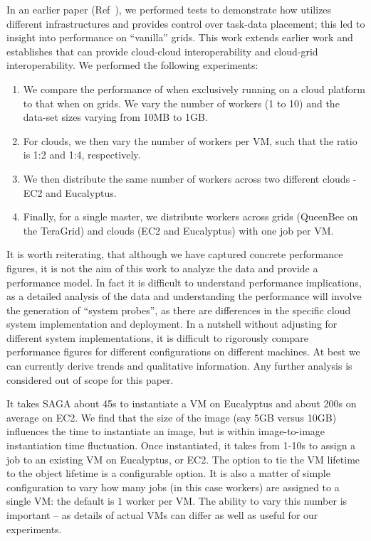 \documentclass[graybox]{svmult}
\begin{document}
In an earlier paper (Ref~\cite{saga_ccgrid09}), we performed tests to
demonstrate how \sagamapreduce utilizes different infrastructures and
provides control over task-data placement; this led to insight into
performance on ``vanilla'' grids.  This work extends earlier work and
establishes that \sagamapreduce can provide cloud-cloud
interoperability and cloud-grid interoperability.  We performed the
following experiments:

\begin{enumerate}

 \item We compare the performance of \sagamapreduce when exclusively
 running on a cloud platform to that when on grids. We vary the number
 of workers (1 to 10) and the data-set sizes varying from 10MB to 1GB.

 \item For clouds, we then vary the number of workers per VM, such
 that the ratio is 1:2 and 1:4, respectively.

 \item We then distribute the same number of workers across two
 different clouds - EC2 and Eucalyptus.

 \item Finally, for a single master, we distribute workers across
 grids (QueenBee on the TeraGrid) and clouds (EC2 and Eucalyptus) with
 one job per VM.

\end{enumerate}

It is worth reiterating, that although we have captured concrete
performance figures, it is not the aim of this work to analyze the
data and provide a performance model. In fact it is difficult to
understand performance implications, as a detailed analysis of the
data and understanding the performance will involve the generation of
``system probes'', as there are differences in the specific cloud
system implementation and deployment.  In a nutshell without adjusting
for different system implementations, it is difficult to rigorously
compare performance figures for different configurations on different
machines. At best we can currently derive trends and qualitative
information.  Any further analysis is considered out of scope for this
paper.

It takes SAGA about 45s to instantiate a VM on Eucalyptus and about
200s on average on EC2.  We find that the size of the image (say 5GB
versus 10GB) influences the time to instantiate an image, but is
within image-to-image instantiation time fluctuation.  Once
instantiated, it takes from 1-10s to assign a job to an existing VM on
Eucalyptus, or EC2.  The option to tie the VM lifetime to the
 object lifetime is a configurable option.  It
is also a matter of simple configuration to vary how many jobs (in
this case workers) are assigned to a single VM:  the default is 1
worker per VM.  The ability to vary this number is important -- as
details of actual VMs can differ as well as useful for our
experiments.
\end{document}
